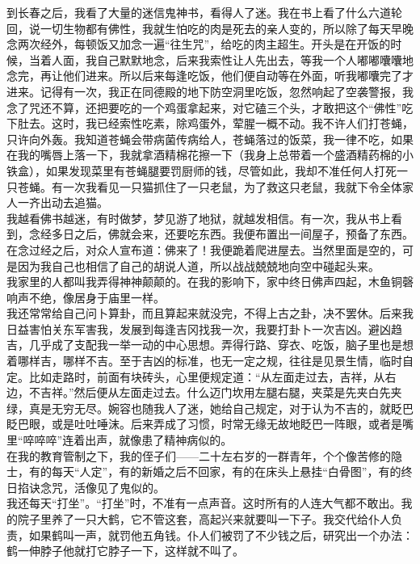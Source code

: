到长春之后，我看了大量的迷信鬼神书，看得人了迷。我在书上看了什么六道轮回，说一切生物都有佛性，我就生怕吃的肉是死去的亲人变的，所以除了每天早晚念两次经外，每顿饭又加念一遍“往生咒”，给吃的肉主超生。开头是在开饭的时候，当着人面，我自己默默地念，后来我索性让人先出去，等我一个人嘟嘟囔囔地念完，再让他们进来。所以后来每逢吃饭，他们便自动等在外面，听我嘟囔完了才进来。记得有一次，我正在同德殿的地下防空洞里吃饭，忽然响起了空袭警报，我念了咒还不算，还把要吃的一个鸡蛋拿起来，对它磕三个头，才敢把这个“佛性”吃下肚去。这时，我已经索性吃素，除鸡蛋外，荤腥一概不动。我不许人们打苍蝇，只许向外轰。我知道苍蝇会带病菌传病给人，苍蝇落过的饭菜，我一律不吃，如果在我的嘴唇上落一下，我就拿酒精棉花擦一下（我身上总带着一个盛酒精药棉的小铁盒），如果发现菜里有苍蝇腿要罚厨师的钱，尽管如此，我却不准任何人打死一只苍蝇。有一次我看见一只猫抓住了一只老鼠，为了救这只老鼠，我就下令全体家人一齐出动去追猫。\\

我越看佛书越迷，有时做梦，梦见游了地狱，就越发相信。有一次，我从书上看到，念经多日之后，佛就会来，还要吃东西。我便布置出一间屋子，预备了东西。在念过经之后，对众人宣布道：佛来了！我便跪着爬进屋去。当然里面是空的，可是因为我自己也相信了自己的胡说人道，所以战战兢兢地向空中碰起头来。\\

我家里的人都叫我弄得神神颠颠的。在我的影响下，家中终日佛声四起，木鱼铜磬响声不绝，像居身于庙里一样。\\

我还常常给自己问卜算卦，而且算起来就没完，不得上古之卦，决不罢休。后来我日益害怕关东军害我，发展到每逢吉冈找我一次，我要打卦卜一次吉凶。避凶趋吉，几乎成了支配我一举一动的中心思想。弄得行路、穿衣、吃饭，脑子里也是想着哪样吉，哪样不吉。至于吉凶的标准，也无一定之规，往往是见景生情，临时自定。比如走路时，前面有块砖头，心里便规定道：“从左面走过去，吉祥，从右边，不吉祥。”然后便从左面走过去。什么迈门坎用左腿右腿，夹菜是先夹白先夹绿，真是无穷无尽。婉容也随我人了迷，她给自己规定，对于认为不吉的，就眨巴眨巴眼，或是吐吐唾沫。后来弄成了习惯，时常无缘无故地眨巴一阵眼，或者是嘴里“啐啐啐”连着出声，就像患了精神病似的。\\

在我的教育管制之下，我的侄子们——二十左右岁的一群青年，个个像苦修的隐士，有的每天“人定”，有的新婚之后不回家，有的在床头上悬挂“白骨图”，有的终日掐诀念咒，活像见了鬼似的。\\

我还每天“打坐”。“打坐”时，不准有一点声音。这时所有的人连大气都不敢出。我的院子里养了一只大鹤，它不管这套，高起兴来就要叫一下子。我交代给仆人负责，如果鹤叫一声，就罚他五角钱。仆人们被罚了不少钱之后，研究出一个办法：鹤一伸脖子他就打它脖子一下，这样就不叫了。\\

